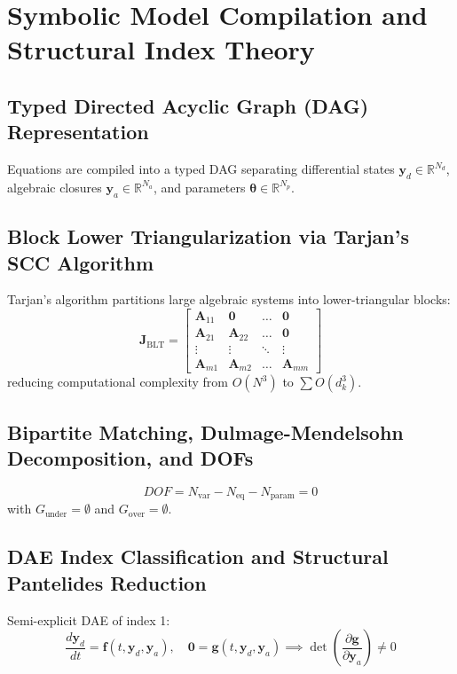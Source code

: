 \documentclass[11pt,a4paper]{article}
\begin{document}
\section{Symbolic Model Compilation and Structural Index Theory}

\subsection{Typed Directed Acyclic Graph (DAG) Representation}
Equations are compiled into a typed DAG separating differential states $\mathbf{y}_d \in \mathbb{R}^{N_d}$, algebraic closures $\mathbf{y}_a \in \mathbb{R}^{N_a}$, and parameters $\boldsymbol{\theta} \in \mathbb{R}^{N_p}$.

\subsection{Block Lower Triangularization via Tarjan's SCC Algorithm}
Tarjan's algorithm partitions large algebraic systems into lower-triangular blocks:
\begin{equation}
\mathbf{J}_{\text{BLT}} = \begin{bmatrix} \mathbf{A}_{11} & \mathbf{0} & \dots & \mathbf{0} \\ \mathbf{A}_{21} & \mathbf{A}_{22} & \dots & \mathbf{0} \\ \vdots & \vdots & \ddots & \vdots \\ \mathbf{A}_{m1} & \mathbf{A}_{m2} & \dots & \mathbf{A}_{mm} \end{bmatrix}
\end{equation}
reducing computational complexity from $O(N^3)$ to $\sum O(d_k^3)$.

\subsection{Bipartite Matching, Dulmage-Mendelsohn Decomposition, and DOFs}
\begin{equation}
DOF = N_{\text{var}} - N_{\text{eq}} - N_{\text{param}} = 0
\end{equation}
with $G_{\text{under}} = \emptyset$ and $G_{\text{over}} = \emptyset$.

\subsection{DAE Index Classification and Structural Pantelides Reduction}
Semi-explicit DAE of index 1:
\begin{equation}
\frac{d\mathbf{y}_d}{dt} = \mathbf{f}(t, \mathbf{y}_d, \mathbf{y}_a), \quad \mathbf{0} = \mathbf{g}(t, \mathbf{y}_d, \mathbf{y}_a) \implies \det\left( \frac{\partial \mathbf{g}}{\partial \mathbf{y}_a} \right) \neq 0
\end{equation}
\end{document}
